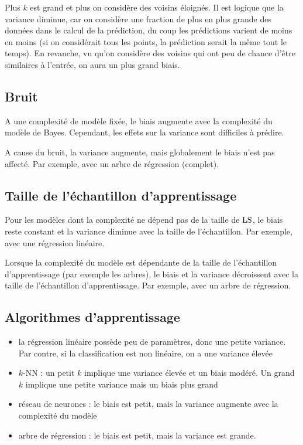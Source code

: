 			
			Plus $k$ est grand et plus on considère des voisins éloignés. Il est logique que la variance diminue, car on considère une fraction de plus en plus grande des données dans le calcul de la prédiction, du coup les prédictions varient de moins en moins (si on considérait tous les points, la prédiction serait la même tout le temps). En revanche, vu qu'on considère des voisins qui ont peu de chance d'être similaires à l'entrée, on aura un plus grand biais.
		
		\subsection{Bruit}
		
		A une complexité de modèle fixée, le biais augmente avec la complexité du modèle de Bayes. Cependant, les effets sur la variance sont difficiles à prédire.
		
		A cause du bruit, la variance augmente, mais globalement le biais n'est pas affecté. Par exemple, avec un arbre de régression (complet).
		
		
		\subsection{Taille de l'échantillon d'apprentissage}
		
		Pour les modèles dont la complexité ne dépend pas de la taille de $\text{LS}$, le biais reste constant et la variance diminue avec la taille de l'échantillon. Par exemple, avec une régression linéaire.
		
		
		Lorsque la complexité du modèle est dépendante de la taille de l'échantillon d'apprentissage (par exemple les arbres), le biais et la variance décroissent avec la taille de l'échantillon d'apprentissage. Par exemple, avec un arbre de régression.
		
		
		\subsection{Algorithmes d'apprentissage}
		
		
		
		\begin{itemize}
			\item la régression linéaire possède peu de paramètres, donc une petite variance. Par contre, si la classification est non linéaire, on a une variance élevée
			\item $k$-NN : un petit $k$ implique une variance élevée et un biais modéré. Un grand $k$ implique une petite variance mais un biais plus grand
			\item réseau de neurones : le biais est petit, mais la variance augmente avec la complexité du modèle
			\item arbre de régression : le biais est petit, mais la variance est grande.
		\end{itemize}

